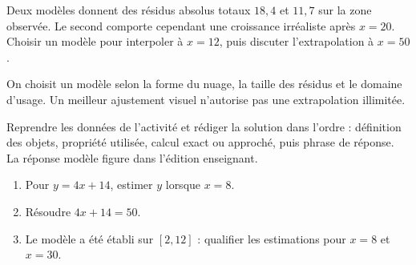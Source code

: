 \begin{activite}
Deux modèles donnent des résidus absolus totaux $18{,}4$ et $11{,}7$ sur la zone observée. Le second comporte cependant une croissance irréaliste après $x=20$. Choisir un modèle pour interpoler à $x=12$, puis discuter l'extrapolation à $x=50$.
\begin{center}\end{center}
\end{activite}

\begin{traceecrite}On choisit un modèle selon la forme du nuage, la taille des résidus et le domaine d'usage. Un meilleur ajustement visuel n'autorise pas une extrapolation illimitée.\end{traceecrite}

\begin{exemple}
Reprendre les données de l'activité et rédiger la solution dans l'ordre : définition des objets, propriété utilisée, calcul exact ou approché, puis phrase de réponse. La réponse modèle figure dans l'édition enseignant.
\end{exemple}

\begin{exercice}[-- essentiel]
\begin{enumerate}\item Pour $y=4x+14$, estimer $y$ lorsque $x=8$.\item Résoudre $4x+14=50$.\item Le modèle a été établi sur $[2,12]$ : qualifier les estimations pour $x=8$ et $x=30$.\end{enumerate}
\end{exercice}

